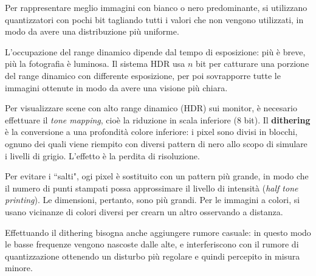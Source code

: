 Per rappresentare meglio immagini con bianco o nero predominante, si utilizzano quantizzatori con pochi bit tagliando tutti i valori che non vengono utilizzati, in modo da avere una distribuzione più uniforme. 

L'occupazione del range dinamico dipende dal tempo di esposizione: più è breve, più la fotografia è luminosa. Il sistema HDR usa $n$ bit per catturare una porzione del range dinamico con differente esposizione, per poi sovrapporre tutte le immagini ottenute in modo da avere una visione più chiara. 

Per visualizzare scene con alto range dinamico (HDR) sui monitor, è necesario effettuare il \textit{tone mapping}, cioè la riduzione in scala inferiore (8 bit). Il \textbf{dithering} è la conversione a una profondità colore inferiore: i pixel sono divisi in blocchi, ognuno dei quali viene riempito con diversi pattern di nero allo scopo di simulare i livelli di grigio. L'effetto è la perdita di risoluzione.

Per evitare i ``salti", ogi pixel è sostituito con un pattern più grande, in modo che il numero di punti stampati possa approssimare il livello di intensità (\textit{half tone printing}). Le dimensioni, pertanto, sono più grandi. Per le immagini a colori, si usano vicinanze di colori diversi per crearn un altro osservando a distanza. 

Effettuando il dithering bisogna anche aggiungere rumore casuale: in questo modo le basse frequenze vengono nascoste dalle alte, e interferiscono con il rumore di quantizzazione ottenendo un disturbo più regolare e quindi percepito in misura minore.
